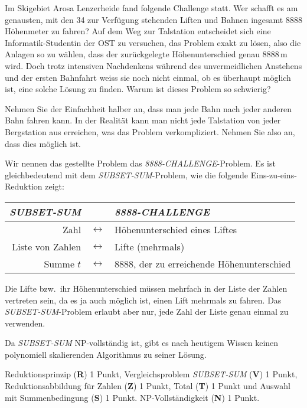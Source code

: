 Im Skigebiet Arosa Lenzerheide fand folgende Challenge statt.
Wer schafft es am genausten, mit den 34 zur Verfügung stehenden
Liften und Bahnen ingesamt 8888 Höhenmeter zu fahren?
Auf dem Weg zur Talstation entscheidet sich eine Informatik-Studentin
der OST zu versuchen, das Problem exakt zu lösen, also die Anlagen
so zu wählen, dass der zurückgelegte Höhenunterschied genau
$8888\,\text{m}$ wird.
Doch trotz intensiven Nachdenkens während des unvermeidlichen Anstehens und
der ersten Bahnfahrt weiss sie noch nicht einmal, ob es überhaupt möglich
ist, eine solche Lösung zu finden.
Warum ist dieses Problem so schwierig?

\begin{hinweis}
Nehmen Sie der Einfachheit halber an, dass man jede Bahn nach jeder
anderen Bahn fahren kann.
In der Realität kann man nicht jede Talstation von jeder Bergstation aus
erreichen, was das Problem verkompliziert.
Nehmen Sie also an, dass dies möglich ist.
\end{hinweis}

\begin{loesung}
Wir nennen das gestellte Problem das \textit{8888-CHALLENGE}-Problem.
Es ist gleichbedeutend mit dem \textit{SUBSET-SUM}-Problem, wie die folgende
Eins-zu-eins-Reduktion zeigt:
\begin{center}
\begin{tabular}{rcl}	
\textit{SUBSET-SUM}&&\textit{8888-CHALLENGE}\\
\hline
Zahl             & $\leftrightarrow$ &Höhenunterschied eines Liftes\\
Liste von Zahlen & $\leftrightarrow$ &Lifte (mehrmals)\\
Summe $t$        & $\leftrightarrow$ &$8888$, der zu erreichende Höhenunterschied
\end{tabular}
\end{center}
Die Lifte bzw.~ihr Höhenunterschied müssen mehrfach in der Liste der
Zahlen vertreten sein, da es ja auch möglich ist, einen Lift mehrmals
zu fahren.
Das \textit{SUBSET-SUM}-Problem erlaubt aber nur, jede Zahl der Liste
genau einmal zu verwenden.

Da \textit{SUBSET-SUM} NP-vollständig ist, gibt es nach heutigem Wissen
keinen polynomiell skalierenden Algorithmus zu seiner Lösung.
\end{loesung}

\begin{bewertung}
Reduktionsprinzip ({\bf R}) 1 Punkt,
Vergleichsproblem \textit{SUBSET-SUM} ({\bf V}) 1 Punkt,
Reduktionsabbildung für Zahlen ({\bf Z}) 1 Punkt,
Total ({\bf T}) 1 Punkt und
Auswahl mit Summenbedingung ({\bf S}) 1 Punkt.
NP-Vollständigkeit ({\bf N}) 1 Punkt.
\end{bewertung}
